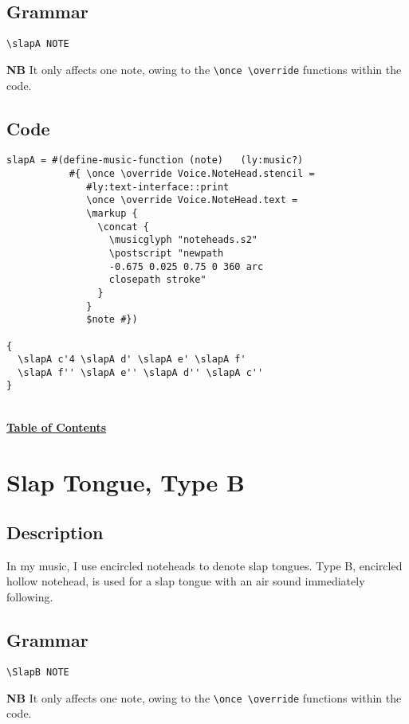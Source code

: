 \subsection{Grammar}
\begin{verbatim}
\slapA NOTE
\end{verbatim}
\textbf{NB} It only affects one note, owing to the \verb|\once \override| functions within the code.
\subsection{Code}
\begin{verbatim}
slapA = #(define-music-function (note)   (ly:music?)
           #{ \once \override Voice.NoteHead.stencil =
              #ly:text-interface::print
              \once \override Voice.NoteHead.text =
              \markup {
                \concat {
                  \musicglyph "noteheads.s2"
                  \postscript "newpath 
                  -0.675 0.025 0.75 0 360 arc 
                  closepath stroke"
                }
              }
              $note #})

{
  \slapA c'4 \slapA d' \slapA e' \slapA f'
  \slapA f'' \slapA e'' \slapA d'' \slapA c''
}

\end{verbatim}
\hyperref[sec:toc]{\\ \textbf{Table of Contents}}

\vfill \break


\section {Slap Tongue, Type B}
\hfill
\subsection{Description}
In my music, I use encircled noteheads to denote slap tongues. Type B, encircled hollow notehead, is used for a slap tongue with an air sound immediately following.  

\subsection{Grammar}
\begin{verbatim}
\SlapB NOTE
\end{verbatim}
\textbf{NB} It only affects one note, owing to the \verb|\once \override| functions within the code.
